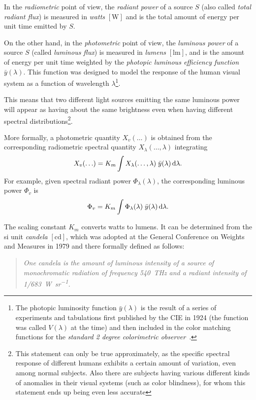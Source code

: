 In the \textsl{radiometric} point of view, the \textsl{radiant power} of a
source $S$
(also called \textsl{total radiant flux}) is measured in
\textit{watts} $[\si{\watt}]$ and is the total amount of energy per unit time
emitted by $S$.

On the other hand, in the \textsl{photometric} point of view, the
\textsl{luminous power}
of a source $S$ (called \textsl{luminous flux}) is measured in
\textit{lumens} $[\si{\lumen}]$, and is the amount of energy per unit time
weighted by the \textsl{photopic luminous efficiency function} $\bar y(\lambda)$. 
This function was designed to model the response of the human visual system as a function of wavelength $\lambda$\footnote{
	The photopic luminosity function $\bar y(\lambda)$ is the result of a series of experiments and tabulations first published by the \gls{CIE} in 1924 (the function was called $V(\lambda)$ at the time) and then included in the color matching functions for the \emph{standard 2 degree colorimetric observer}~\citep{cie1931}.}.

This means that two different light sources emitting the same luminous
power will appear as having about the same brightness even when having
different spectral distributions\footnote{This
statement can only be true approximately, as the specific spectral response
of different humans exhibits a certain amount of variation, even among
normal subjects.
Also there are subjects having various different kinds of anomalies in their
visual systems (such as color blindness), for whom this statement ends up being even less accurate}.

More formally, a photometric quantity $X_v(\ldots)$ is obtained from 
the corresponding radiometric spectral quantity $X_{\lambda}(\ldots, \lambda)$
integrating
\begin{equation}
X_v(\ldots) = K_m \int X_{\lambda}(\ldots,\lambda)\; \bar y (\lambda) \mathop{}\!\mathrm{d}\lambda.
\label{eqn:rad_to_photo}
\end{equation}
For example, given spectral radiant power $\Phi_{\lambda}(\lambda)$, the
corresponding
luminous power $\Phi_v$ is
\begin{displaymath}
\Phi_v = K_m \int \Phi_{\lambda}(\lambda)\; \bar y(\lambda) \mathop{}\!\mathrm{d}\lambda.
\end{displaymath}

The scaling constant $K_m$ converts watts to lumens. It can be determined
from the 
\gls{si} unit \textsl{candela} $[\si{\candela}]$, which was adopted at
the General Conference on Weights and Measures in 1979 and
there formally defined as follows:
\begin{quote}
\emph{One candela is the amount of luminous intensity of a source of
monochromatic radiation of frequency \SI{540}{\tera\hertz} and
a radiant intensity of \SI{1/683}{\watt\per\steradian}.}
\end{quote}

